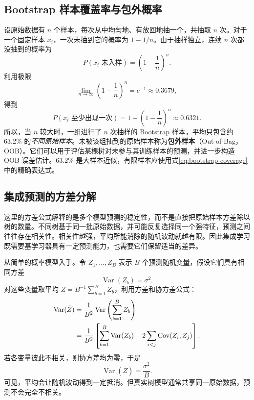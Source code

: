 \subsection{Bootstrap 样本覆盖率与包外概率}

设原始数据有 $n$ 个样本，每次从中均匀地、有放回地抽一个，共抽取 $n$ 次。对于一个固定样本 $x_i$，一次未抽到它的概率为 $1-1/n$。由于抽样独立，连续 $n$ 次都没抽到的概率为
\begin{equation}\label{eq:bootstrap-oob-prob}
P(x_i\text{ 未入样})=\left(1-\frac1n\right)^n.
\end{equation}
利用极限
\[
\lim_{n\to\infty}\left(1-\frac1n\right)^n=e^{-1}\approx0.3679,
\]
得到
\begin{equation}\label{eq:bootstrap-coverage}
P(x_i\text{ 至少出现一次})
=1-\left(1-\frac1n\right)^n\approx0.6321.
\end{equation}
所以，当 $n$ 较大时，一组进行了 $n$ 次抽样的 Bootstrap 样本，平均只包含约 $63.2\%$ 的\emph{不同原始样本}。未被该组抽到的原始样本称为\textbf{包外样本}（Out-of-Bag，OOB）。它们可以用于评估某棵树对未参与其训练样本的预测，并进一步构造 OOB 误差估计。$63.2\%$ 是大样本近似，有限样本应使用式\eqref{eq:bootstrap-coverage}中的精确表达式。

\subsection{集成预测的方差分解}

这里的方差公式解释的是多个模型预测的稳定性，而不是直接把原始样本方差除以树的数量。不同树基于同一批原始数据，并可能反复选择同一个强特征，预测之间往往存在相关性。相关性越强，平均所能消除的随机波动就越有限。因此集成学习既需要基学习器具有一定预测能力，也需要它们保留适当的差异。

从简单的概率模型入手。令 $Z_1,\ldots,Z_B$ 表示 $B$ 个预测随机变量，假设它们具有相同方差
\[
\operatorname{Var}(Z_b)=\sigma^2.
\]
对这些变量取平均 $\bar Z=B^{-1}\sum_{b=1}^{B}Z_b$，利用方差和协方差公式：
\begin{align}
\operatorname{Var}(\bar Z)
&=\frac1{B^2}\operatorname{Var}\left(\sum_{b=1}^{B}Z_b\right)\notag\\
&=\frac1{B^2}\left[
\sum_{b=1}^{B}\operatorname{Var}(Z_b)
+2\sum_{i<j}\operatorname{Cov}(Z_i,Z_j)\right].
\label{eq:ensemble-variance-general}
\end{align}
若各变量彼此不相关，则协方差均为零，于是
\[
\operatorname{Var}(\bar Z)=\frac{\sigma^2}{B}.
\]
可见，平均会让随机波动得到一定抵消。但真实树模型通常共享同一原始数据，预测不会完全不相关。

